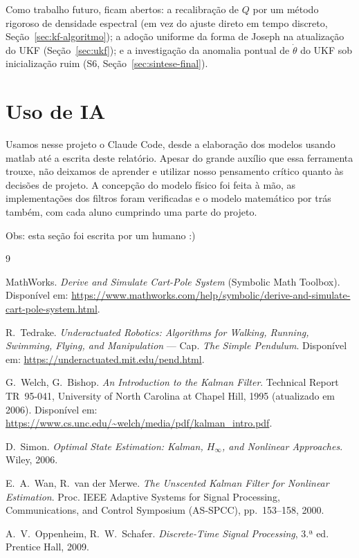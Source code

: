 \documentclass[brazil, 12pt]{article}
\begin{document}
Como trabalho futuro, ficam abertos: a recalibração de $Q$ por um método
rigoroso de densidade espectral (em vez do ajuste direto em tempo discreto,
Seção~\ref{sec:kf-algoritmo}); a adoção uniforme da forma de Joseph na
atualização do UKF (Seção~\ref{sec:ukf}); e a investigação da anomalia pontual
de $\dot\theta$ do UKF sob inicialização ruim (S6, Seção~\ref{sec:sintese-final}).


\section{Uso de IA}

Usamos nesse projeto o Claude Code, desde a elaboração dos modelos usando matlab até a escrita deste relatório.
Apesar do grande auxílio que essa ferramenta trouxe, não deixamos de aprender e utilizar nosso pensamento crítico quanto às decisões de projeto. A concepção do modelo físico foi feita à mão, as implementações dos filtros foram verificadas e o modelo matemático por trás também, com cada aluno cumprindo uma parte do projeto. 

Obs: esta seção foi escrita por um humano :)
\begin{thebibliography}{9}

MathWorks. \emph{Derive and Simulate Cart-Pole System} (Symbolic Math Toolbox).
Disponível em:
\url{https://www.mathworks.com/help/symbolic/derive-and-simulate-cart-pole-system.html}.

R.~Tedrake. \emph{Underactuated Robotics: Algorithms for Walking, Running,
Swimming, Flying, and Manipulation} --- Cap. \emph{The Simple Pendulum}.
Disponível em: \url{https://underactuated.mit.edu/pend.html}.

G.~Welch, G.~Bishop. \emph{An Introduction to the Kalman Filter}. Technical
Report TR~95-041, University of North Carolina at Chapel Hill, 1995
(atualizado em 2006). Disponível em:
\url{https://www.cs.unc.edu/~welch/media/pdf/kalman_intro.pdf}.

D.~Simon. \emph{Optimal State Estimation: Kalman, $H_\infty$, and Nonlinear
Approaches}. Wiley, 2006.

E.~A.~Wan, R.~van der Merwe. \emph{The Unscented Kalman Filter for Nonlinear
Estimation}. Proc. IEEE Adaptive Systems for Signal Processing, Communications,
and Control Symposium (AS-SPCC), pp.~153--158, 2000.

A.~V.~Oppenheim, R.~W.~Schafer. \emph{Discrete-Time Signal Processing}, 3.ª
ed. Prentice Hall, 2009.

\end{thebibliography}
\end{document}
